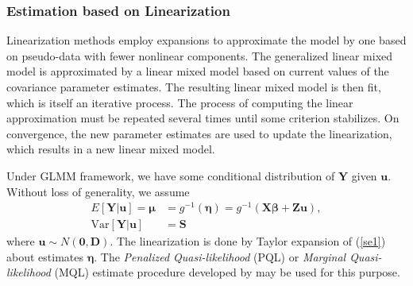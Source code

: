 	\subsubsection{Estimation based on Linearization}
	
	Linearization methods employ expansions to approximate the model by one based on pseudo-data with fewer nonlinear components. The generalized linear mixed model is approximated by a linear mixed model based on current values of the covariance parameter estimates. The resulting linear mixed model is then fit, which is itself an iterative process. The process of computing the linear approximation must be repeated several times until some criterion stabilizes.  On convergence, the new parameter estimates are used to update the linearization, which results in a new linear mixed model. 
	
	Under GLMM framework, we have some conditional distribution of $\bm Y$ given $\bm u$. Without loss of generality, we assume
	\begin{equation}\label{se1}
	\begin{aligned}
	E[\bm Y|\bm u] = \bm \mu &= g^{-1}(\bm \eta) = g^{-1}(\bm{X\beta} + \bm {Zu}), \\
	\text{Var}[\bm Y|\bm u]  & = \bm S
	\end{aligned}
	\end{equation}
	where $\bm u \sim N(\bm 0, \bm D)$.  The linearization  is done by Taylor expansion of (\ref{se1}) about estimates $\bm \eta$. The \textit{Penalized Quasi-likelihood } (PQL) or \textit{Marginal Quasi-likelihood} (MQL) estimate procedure developed by \cite{breslow1993approximate} may be used for this purpose. 
	
